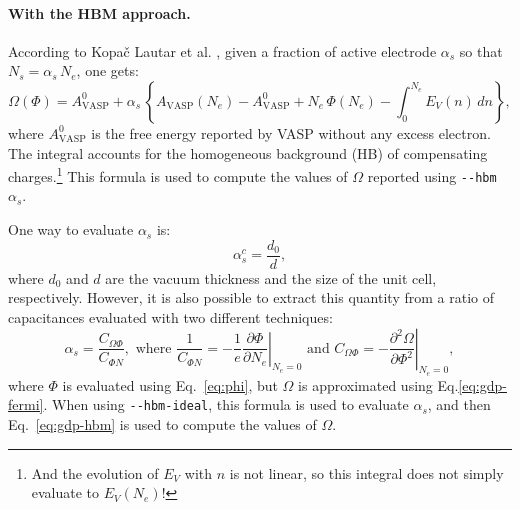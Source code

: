 \documentclass[12pt,a4paper]{article}
\begin{document}
	\paragraph{With the HBM approach.} According to Kopa{\v c} Lautar et al. \cite{kopaclautarModelingInterfacialElectrochemistry2020}, given a fraction of active electrode $\alpha_s$ so that $N_s = \alpha_s\,N_e$, one gets:\begin{equation}
		\Omega(\Phi) =  A_{\text{VASP}}^0 + \alpha_s\,\left\{A_{\text{VASP}}(N_e)-A_{\text{VASP}}^0+ N_e\,\Phi(N_e)-\int_0^{N_e} E_V(n)\,dn\right\}, \label{eq:gdp-hbm}
	\end{equation}
	where $A_{\text{VASP}}^0$ is the free energy reported by VASP without any excess electron. The integral accounts for the homogeneous background (HB) of compensating charges.\footnote{And the evolution of $E_V$ with $n$ is not linear, so this integral does not simply evaluate to $E_V(N_e)$!} This formula is used to compute the values of $\Omega$ reported using  \texttt{\lstinline|--hbm| $\alpha_s$}.
	
	
	One way to evaluate $\alpha_s$ is:\begin{equation*}
		\alpha_s^c = \frac{d_0}{d},
	\end{equation*}
	where $d_0$ and $d$ are the vacuum thickness and the size of the unit cell, respectively. However, it is also possible to extract this quantity from a ratio of capacitances evaluated with two different techniques: \cite{hagopianAdvancementHomogeneousBackground2022}\begin{equation*}
		\alpha_s = \frac{C_{\Omega\Phi}}{C_{\Phi N}}, \text{ where }  \frac{1}{C_{\Phi N}} = \left.-\frac{1}{e}\frac{\partial\Phi}{\partial N_e}\right|_{N_e=0} \text{ and } C_{\Omega\Phi} = \left.-\frac{\partial^2\Omega}{\partial\Phi^2}\right|_{N_e=0},
	\end{equation*}
	where $\Phi$ is evaluated using Eq.~\eqref{eq:phi}, but $\Omega$ is approximated using Eq.\eqref{eq:gdp-fermi}. When using \texttt{\lstinline|--hbm-ideal|}, this formula is used to evaluate $\alpha_s$, and then Eq.~\eqref{eq:gdp-hbm} is used to compute the values of $\Omega$.
	
	
	
\end{document}

